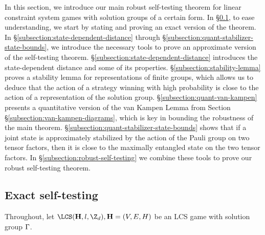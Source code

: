 
In this section, we introduce our main robust self-testing theorem for linear constraint system games with solution groups of a certain form. In \S \ref{subsection:exact-self-testing}, to ease understanding, we start by stating and proving an exact version of the theorem. In \S \ref{subsection:state-dependent-distance} through \S \ref{subsection:quant-stabilizer-state-bounds}, we introduce the necessary tools to prove an approximate version of the self-testing theorem. \S \ref{subsection:state-dependent-distance} introduces the state-dependent distance and some of its properties. \S \ref{subsection:stability-lemma} proves a stability lemma for representations of finite groups, which allows us to deduce that the action of a strategy winning with high probability is close to the action of a representation of the solution group.  \S \ref{subsection:quant-van-kampen} presents a quantitative version of the van Kampen Lemma from Section \S \ref{subsection:van-kampen-diagrams}, which is key in bounding the robustness of the main theorem. \S \ref{subsection:quant-stabilizer-state-bounds} shows that if a joint state is approximately stabilized by the action of the Pauli group on two tensor factors, then it is close to the maximally entangled state on the two tensor factors. In \S \ref{subsection:robust-self-testing} we combine these tools to prove our robust self-testing theorem. 
 
\subsection{Exact self-testing}
\label{subsection:exact-self-testing}

Throughout, let $\LCS(\mathbf H, l, \Z_d), \mathbf H = (V,E,H)$ be an LCS game with solution group $\Gamma$.

